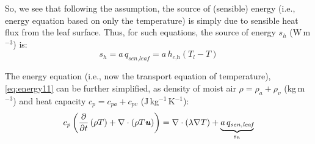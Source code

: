 So, we see that following the assumption, the source of (sensible) energy (i.e., energy equation based on only the temperature) is simply due to sensible heat flux from the leaf surface. Thus, for such equations, the source of energy $s_h$ (W\,m$^{-3}$) is:
\begin{equation}
{s_h} =  a\,q_{\textit{sen,leaf}} = a\, h_{\textit{c,h}} \left(T_l - T\right)
\label{eq:shterm5}
\end{equation}

The energy equation (i.e., now the transport equation of temperature), \cref{eq:energy11} can be further simplified, as density of moist air $\rho = \rho_a + \rho_v$ (kg\,m$^{-3}$) and heat capacity $c_p = c_{\textit{pa}} + c_{\textit{pv}}$ (J\,kg$^{-1}$\,K$^{-1}$):
\begin{equation}
c_p  \left( \frac{\partial }{\partial t} \left( \rho T \right) + \nabla \cdot \left(\rho T \textbf{\textit{u}} \right)  \right) = \nabla  \cdot \left(\lambda \nabla T \right) + \underbrace{a\,q_{\textit{sen,leaf}}}_{s_h}
\label{eq:energy12}
\end{equation}

